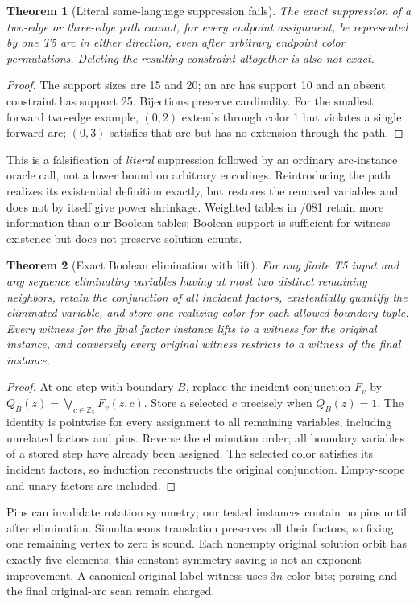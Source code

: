 \documentclass[11pt]{article}
\newtheorem{theorem}{Theorem}
\newcommand{\Z}{\mathbb Z_5}
\begin{document}
\begin{theorem}[Literal same-language suppression fails]
The exact suppression of a two-edge or three-edge path cannot, for every
endpoint assignment, be represented by one T5 arc in either direction,
even after arbitrary endpoint color permutations. Deleting the resulting
constraint altogether is also not exact.
\end{theorem}
\begin{proof}
The support sizes are 15 and 20; an arc has support 10 and an absent constraint
has support 25. Bijections preserve cardinality. For the smallest forward
two-edge example, $(0,2)$ extends through color 1 but violates a single forward
arc; $(0,3)$ satisfies that arc but has no extension through the path.
\end{proof}
This is a falsification of \emph{literal} suppression followed by an ordinary
arc-instance oracle call, not a lower bound on arbitrary encodings. Reintroducing
the path realizes its existential definition exactly, but restores the removed
variables and does not by itself give power shrinkage. Weighted tables in /081
retain more information than our Boolean tables; Boolean support is sufficient
for witness existence but does not preserve solution counts.

\begin{theorem}[Exact Boolean elimination with lift]
For any finite T5 input and any sequence eliminating variables having at most
two distinct remaining neighbors, retain the conjunction of all incident
factors, existentially quantify the eliminated variable, and store one
realizing color for each allowed boundary tuple. Every witness for the final
factor instance lifts to a witness for the original instance, and conversely
every original witness restricts to a witness of the final instance.
\end{theorem}
\begin{proof}
At one step with boundary $B$, replace the incident conjunction $F_v$ by
$Q_B(z)=\bigvee_{c\in\Z}F_v(z,c)$. Store a selected $c$ precisely when
$Q_B(z)=1$. The identity is pointwise for every assignment to all remaining
variables, including unrelated factors and pins. Reverse the elimination
order; all boundary variables of a stored step have already been assigned.
The selected color satisfies its incident factors, so induction reconstructs
the original conjunction. Empty-scope and unary factors are included.
\end{proof}
Pins can invalidate rotation symmetry; our tested instances contain no pins
until after elimination. Simultaneous translation preserves all their factors,
so fixing one remaining vertex to zero is sound. Each nonempty original
solution orbit has exactly five elements; this constant symmetry saving is
not an exponent improvement. A canonical original-label witness uses $3n$
color bits; parsing and the final original-arc scan remain charged.
\end{document}
